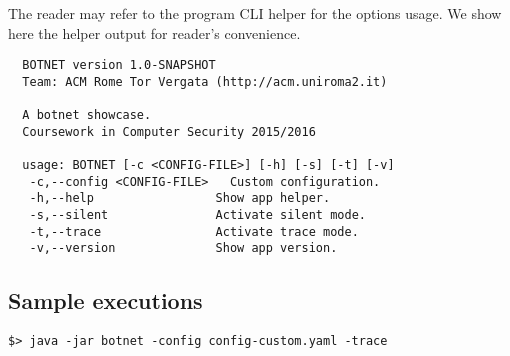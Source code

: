 The reader may refer to the program CLI helper for the options usage. We show here the helper output for reader's convenience.

\begin{verbatim}
  BOTNET version 1.0-SNAPSHOT
  Team: ACM Rome Tor Vergata (http://acm.uniroma2.it)

  A botnet showcase.
  Coursework in Computer Security 2015/2016

  usage: BOTNET [-c <CONFIG-FILE>] [-h] [-s] [-t] [-v]
   -c,--config <CONFIG-FILE>   Custom configuration.
   -h,--help                 Show app helper.
   -s,--silent               Activate silent mode.
   -t,--trace                Activate trace mode.
   -v,--version              Show app version.
\end{verbatim}

\subsection{Sample executions}
\label{sec:sample-executions}

\textcolor{blue}{\lipsum[1]}

\begin{verbatim}
$> java -jar botnet -config config-custom.yaml -trace
\end{verbatim}

\textcolor{blue}{\lipsum[1]}
